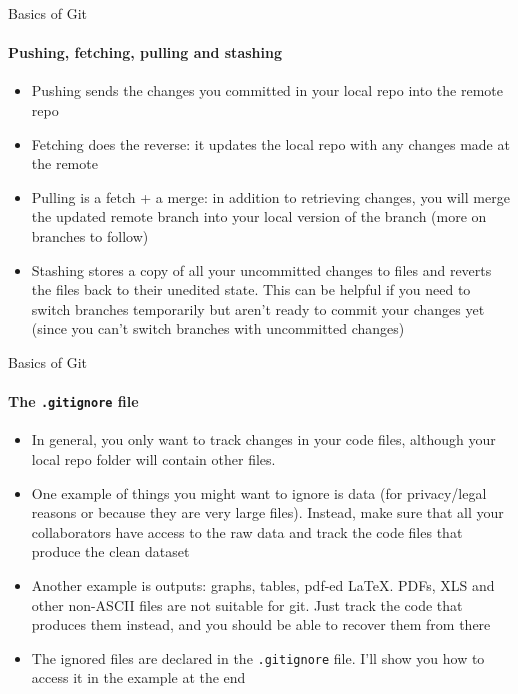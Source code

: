 \documentclass[10pt, aspectratio=169, xcolor=dvipsnames]{beamer}
\let\olditem\item
\renewcommand{\item}{%
\olditem\vspace{0.3em}}
\begin{document}
\begin{frame}[t]{Basics of Git}
    \framesubtitle{Pushing, fetching, pulling and stashing}

    \normalsize\vspace{0.5em}
    \begin{itemize}
        \item \alert{Pushing} sends the changes you committed in your local repo into the remote repo
        \item \alert{Fetching} does the reverse: it updates the local repo with any changes made at the remote
        \item \alert{Pulling} is a fetch + a merge: in addition to retrieving changes, you will merge the updated remote branch into your local version of the branch (more on branches to follow)
        \item \alert{Stashing} stores a copy of all your uncommitted changes to files and reverts the files back to their unedited state. This can be helpful if you need to switch branches temporarily but aren't ready to commit your changes yet (since you can't switch branches with uncommitted changes)
    \end{itemize}
\end{frame}

\begin{frame}[t]{Basics of Git}
    \framesubtitle{The \texttt{.gitignore} file}

    \normalsize\vspace{0.5em}
    \begin{itemize}
        \item In general, you only want to track changes in your code files, although your local repo folder will contain other files.
        \item One example of things you might want to ignore is data (for privacy/legal reasons or because they are very large files). Instead, make sure that all your collaborators have access to the raw data and track the code files that produce the clean dataset
        \item Another example is outputs: graphs, tables, pdf-ed LaTeX. PDFs, XLS and other non-ASCII files are not suitable for git. Just track the code that produces them instead, and you should be able to recover them from there
        \item The ignored files are declared in the \texttt{.gitignore} file. I'll show you how to access it in the example at the end
    \end{itemize}
\end{frame}
\end{document}
